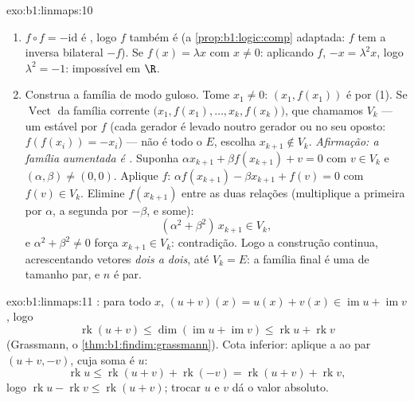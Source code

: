 \begin{solution}{exo:b1:linmaps:10}
\begin{enumerate}
  \item $f \circ f = -\mathrm{id}$ é , logo $f$ também é (a \cref{prop:b1:logic:comp} adaptada: $f$
        tem a inversa bilateral $-f$). Se $f(x) = \lambda x$ com $x \neq 0$:
        aplicando $f$, $-x = \lambda^2 x$, logo $\lambda^2 = -1$: impossível em $\R$.
  \item Construa a família de modo guloso. Tome $x_1 \neq 0$: $(x_1,
        f(x_1))$ é
         por (1). Se $\operatorname{Vect}$ da família corrente $\bigl(x_1, f(x_1), \dots, x_k,
        f(x_k)\bigr)$, que
        chamamos $V_k$ --- um  estável por $f$ (cada
        gerador é levado noutro gerador ou no seu oposto: $f(f(x_i)) = -x_i$)
        --- não é todo o $E$, escolha $x_{k+1}
        \notin V_k$. \emph{Afirmação: a
        família aumentada é .} Suponha $\alpha x_{k+1} + \beta f(x_{k+1}) + v = 0$ com $v
        \in V_k$ e
        $(\alpha, \beta) \neq (0,0)$. Aplique $f$: $\alpha f(x_{k+1}) - \beta x_{k+1} + f(v) = 0$ com $f(v)
        \in V_k$. Elimine $f(x_{k+1})$
        entre as duas relações (multiplique a primeira por
        $\alpha$, a segunda por $-\beta$, e some):
        \[
        (\alpha^2 + \beta^2)\, x_{k+1} \in V_k ,
        \]
        e $\alpha^2 + \beta^2 \neq 0$ força $x_{k+1} \in V_k$: contradição. Logo a construção
        continua, acrescentando vetores \emph{dois a dois}, até
        $V_k = E$: a família final é uma  de tamanho par, e $n$
        é par.
\end{enumerate}
\end{solution}

\begin{solution}{exo:b1:linmaps:11}
: para todo $x$, $(u + v)(x) = u(x) + v(x) \in
\operatorname{im} u + \operatorname{im} v$, logo
\[
\operatorname{rk}(u + v)
\leq \dim(\operatorname{im} u + \operatorname{im} v)
\leq \operatorname{rk} u + \operatorname{rk} v
\]
(Grassmann, o \cref{thm:b1:findim:grassmann}). Cota inferior: aplique a  ao par
$(u + v, -v)$, cuja soma é $u$:
\[
\operatorname{rk} u \leq \operatorname{rk}(u + v) +
\operatorname{rk}(-v) = \operatorname{rk}(u + v) +
\operatorname{rk} v,
\]
logo $\operatorname{rk} u - \operatorname{rk} v \leq
\operatorname{rk}(u+v)$; trocar $u$ e $v$ dá o valor absoluto.
\end{solution}

